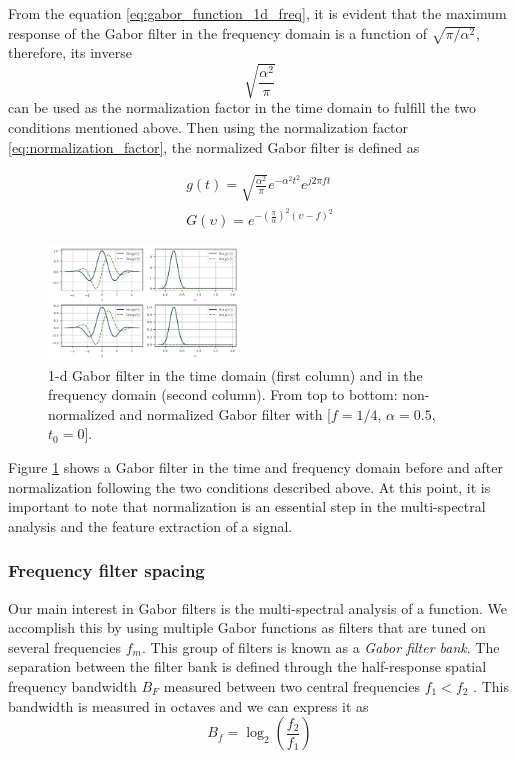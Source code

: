 \documentclass[journal]{IEEEtran}
\begin{document}
From the equation \eqref{eq:gabor_function_1d_freq}, it is evident that the maximum response of the Gabor filter in the frequency domain is a function of $\sqrt{\pi/\alpha^2}$, therefore, its inverse
\begin{equation}\label{eq:normalization_factor}
    \sqrt{\frac{\alpha^2}{\pi}}
\end{equation}
can be used as the normalization factor in the time domain to fulfill the two conditions mentioned above. Then using the normalization factor \eqref{eq:normalization_factor}, the normalized Gabor filter is defined as

\begin{equation}\label{eq:gabor_function_1d_timefreq_normalized}
    \begin{gathered}
         g(t) =  \sqrt{\frac{\alpha^2}{\pi}} e ^{-\alpha^2 t^2} e ^{j 2 \pi f t } \\
         G(\upsilon) =  e ^{-\left(\frac{\pi}{\alpha}\right) ^2 (\upsilon-f)^2}
     \end{gathered}
\end{equation}

\begin{figure}[!ht]
	\centering
	\includegraphics[width=0.45\textwidth]{GaborFilter_timefreq_1d_norm_efect}
	\caption{1-d Gabor filter in the time domain (first column) and in the frequency domain (second  column). From top to bottom: non-normalized and normalized Gabor filter with [$f =1/4$, $\alpha=0.5$, $t_0=0$].}\label{fig:GaborFilter_timefreq_norm_efect}
\end{figure}

Figure \ref{fig:GaborFilter_timefreq_norm_efect} shows a Gabor filter in the time and frequency domain before and after normalization following the two conditions described above. At this point, it is important to note that normalization is an essential step in the multi-spectral analysis and the feature extraction of a signal.

\subsubsection{Frequency filter spacing}\label{subsec:frequency_filter_spacing}
Our main interest in Gabor filters is the multi-spectral analysis of a function. We accomplish this by using multiple Gabor functions as filters that are tuned on several frequencies $f_m$. This group of filters is known as a \textit{Gabor filter bank}. The separation between the filter bank is defined through the half-response spatial frequency bandwidth $B_F$ measured between two central frequencies $f_1 < f_2$ \cite{Granlund:CGIP:1978}. This bandwidth is measured in octaves and we can express it as
\begin{equation}\label{eq:octave_spacing}
    B_f = \log_2 \left( \frac{f_2}{f_1} \right)
\end{equation}
\end{document}
